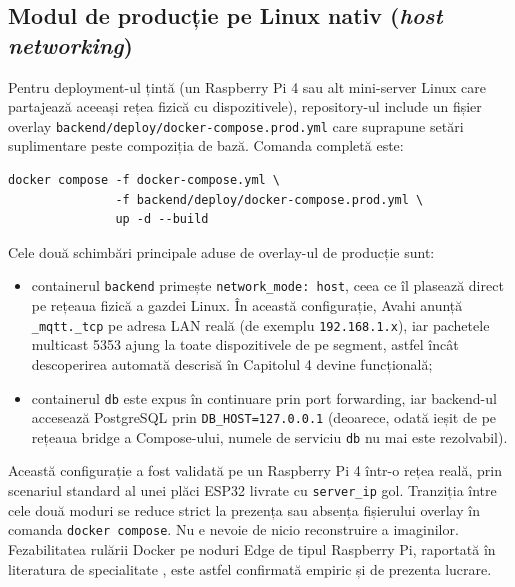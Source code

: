 \subsection{Modul de producție pe Linux nativ (\emph{host networking})}
Pentru deployment-ul țintă (un Raspberry Pi 4 sau alt mini-server Linux care partajează aceeași rețea fizică cu dispozitivele), repository-ul include un fișier overlay \texttt{backend/deploy/docker-compose.prod.yml} care suprapune setări suplimentare peste compoziția de bază. Comanda completă este:
\begin{verbatim}
docker compose -f docker-compose.yml \
               -f backend/deploy/docker-compose.prod.yml \
               up -d --build
\end{verbatim}
Cele două schimbări principale aduse de overlay-ul de producție sunt:
\begin{itemize}
    \item containerul \texttt{backend} primește \texttt{network\_mode: host}, ceea ce îl plasează direct pe rețeaua fizică a gazdei Linux. În această configurație, Avahi anunță \texttt{\_mqtt.\_tcp} pe adresa LAN reală (de exemplu \texttt{192.168.1.x}), iar pachetele multicast 5353 ajung la toate dispozitivele de pe segment, astfel încât descoperirea automată descrisă în Capitolul 4 devine funcțională;
    \item containerul \texttt{db} este expus în continuare prin port forwarding, iar backend-ul accesează PostgreSQL prin \texttt{DB\_HOST=127.0.0.1} (deoarece, odată ieșit de pe rețeaua bridge a Compose-ului, numele de serviciu \texttt{db} nu mai este rezolvabil).
\end{itemize}
Această configurație a fost validată pe un Raspberry Pi 4 într-o rețea reală, prin scenariul standard al unei plăci ESP32 livrate cu \texttt{server\_ip} gol. Tranziția între cele două moduri se reduce strict la prezența sau absența fișierului overlay în comanda \texttt{docker compose}. Nu e nevoie de nicio reconstruire a imaginilor. Fezabilitatea rulării Docker pe noduri Edge de tipul Raspberry Pi, raportată în literatura de specialitate \cite{docker_iot_edge}, este astfel confirmată empiric și de prezenta lucrare.

